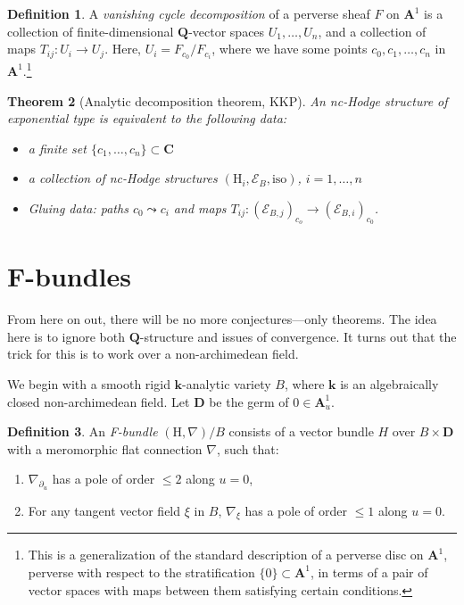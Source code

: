 \documentclass[11pt, reqno]{amsart}
\numberwithin{equation}{section}
\theoremstyle{plain}
\newtheorem{theorem}{Theorem}[section]
\theoremstyle{definition}
\newtheorem{definition}[theorem]{Definition}
\theoremstyle{italicsname}
\newcommand{\cE}{\mathcal{E}}
\newcommand{\rH}{\mathrm{H}}
\newcommand{\bA}{\mathbf{A}}
\newcommand{\bC}{\mathbf{C}}
\newcommand{\bD}{\mathbf{D}}
\newcommand{\bQ}{\mathbf{Q}}
\newcommand{\bk}{\mathbf{k}}
\begin{document}
\begin{definition}
\label{def:vanishing_cycle_decomposition}
    A \emph{vanishing cycle decomposition} of a perverse sheaf $F$ on $\bA^1$ is a collection of finite-dimensional $\bQ$-vector spaces $U_1, \dots, U_n$, and a collection of maps $T_{i j}:U_i \to U_j$. Here, $U_i = F_{c_0}/F_{c_i}$, where we have some points $c_0, c_1, \dots, c_n$ in $\bA^1$.\footnote{This is a generalization of the standard description of a perverse disc on $\bA^1$, perverse with respect to the stratification $\{0\} \subset \bA^1$, in terms of a pair of vector spaces with maps between them satisfying certain conditions.}
\end{definition}



\begin{theorem}[Analytic decomposition theorem, KKP]
\label{thm:analytic_decomposition_theorem}
    An nc-Hodge structure of exponential type is equivalent to the following data:
    \begin{itemize}
        \item a finite set $\{c_1, \dots, c_n\} \subset \bC$
        \item a collection of nc-Hodge structures $(\rH_i, \cE_B, \mathrm{iso})$, $i = 1, \dots, n$
        \item Gluing data: paths $c_0 \leadsto c_i$ and maps $T_{ij}: (\cE_{B, j})_{c_o} \to (\cE_{B, i})_{c_0}$.
    \end{itemize}
\end{theorem}



\section{F-bundles} %
\label{sec:f_bundles}

From here on out, there will be no more conjectures---only theorems. The idea here is to ignore both $\bQ$-structure and issues of convergence. It turns out that the trick for this is to work over a non-archimedean field. 

We begin with a smooth rigid $\bk$-analytic variety $B$, where $\bk$ is an algebraically closed non-archimedean field. Let $\bD$ be the germ of $0 \in \bA^1_u$.

\begin{definition}
\label{def:f_bundle}
    An \emph{F-bundle} $(\rH, \nabla)/B$ consists of a vector bundle $H$ over $B \times \bD$ with a meromorphic flat connection $\nabla$, such that:
    \begin{enumerate} [label = (\arabic*)]
         \item $\nabla_{\partial_u}$ has a pole of order $\leq 2$ along $u = 0$,
         \item For any tangent vector field $\xi$ in $B$, $\nabla_{\xi}$ has a pole of order $\leq 1$ along $u = 0$.
     \end{enumerate} 
\end{definition}
\end{document}
